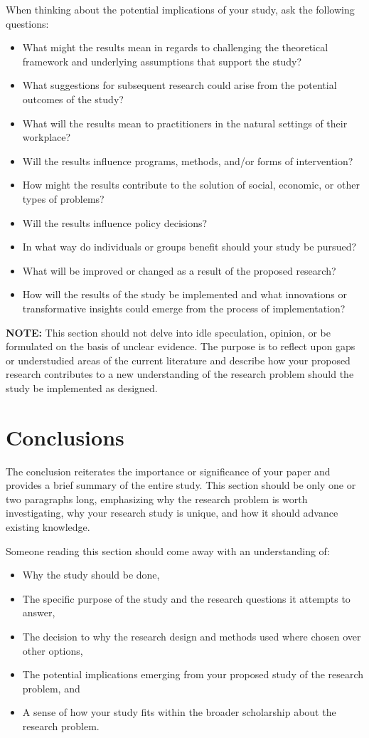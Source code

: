 \documentclass[10pt,twocolumn,letterpaper]{article}
\begin{document}
When thinking about the potential implications of your study, ask the following questions:
\begin{itemize}
    \item What might the results mean in regards to challenging the theoretical framework and underlying assumptions that support the study?
    \item What suggestions for subsequent research could arise from the potential outcomes of the study?
    \item What will the results mean to practitioners in the natural settings of their workplace?
    \item Will the results influence programs, methods, and/or forms of intervention?
    \item How might the results contribute to the solution of social, economic, or other types of problems?
    \item Will the results influence policy decisions?
    \item In what way do individuals or groups benefit should your study be pursued?
    \item What will be improved or changed as a result of the proposed research?
    \item How will the results of the study be implemented and what innovations or transformative insights could emerge from the process of implementation?
\end{itemize}

\textbf{NOTE:} This section should not delve into idle speculation, opinion, or be formulated on the basis of unclear evidence. The purpose is to reflect upon gaps or understudied areas of the current literature and describe how your proposed research contributes to a new understanding of the research problem should the study be implemented as designed.

\section{Conclusions}
The conclusion reiterates the importance or significance of your paper and provides a brief summary of the entire study. This section should be only one or two paragraphs long, emphasizing why the research problem is worth investigating, why your research study is unique, and how it should advance existing knowledge.

Someone reading this section should come away with an understanding of:
\begin{itemize}
    \item Why the study should be done,
    \item The specific purpose of the study and the research questions it attempts to answer,
    \item The decision to why the research design and methods used where chosen over other options,
    \item The potential implications emerging from your proposed study of the research problem, and
    \item A sense of how your study fits within the broader scholarship about the research problem.
\end{itemize}
\end{document}
